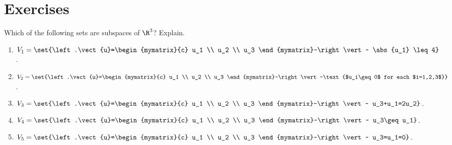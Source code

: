 \section*{Exercises}

\begin{ex}
  Which of the following sets are subspaces of $\R^3$? Explain.
  \begin{enumerate}
  \item $V_1=\set{\left.\vect{u}=\begin{mymatrix}{c}
          u_1 \\ u_2 \\ u_3
        \end{mymatrix}~\right\vert~ \abs{u_1} \leq 4}$.
  \item $V_2=\set{\left.\vect{u}=\begin{mymatrix}{c}
          u_1 \\ u_2 \\ u_3
        \end{mymatrix}~\right\vert~\text{$u_i\geq 0$ for each $i=1,2,3$}}$.
  \item $V_3=\set{\left.\vect{u}=\begin{mymatrix}{c}
          u_1 \\ u_2 \\ u_3
        \end{mymatrix}~\right\vert~ u_3+u_1=2u_2}$.
  \item $V_4=\set{\left.\vect{u}=\begin{mymatrix}{c}
          u_1 \\ u_2 \\ u_3
        \end{mymatrix}~\right\vert~ u_3\geq u_1}$.
  \item $V_5=\set{\left.\vect{u}=\begin{mymatrix}{c}
          u_1 \\ u_2 \\ u_3
        \end{mymatrix}~\right\vert~ u_3=u_1=0}$.
  \end{enumerate}


\end{ex}
